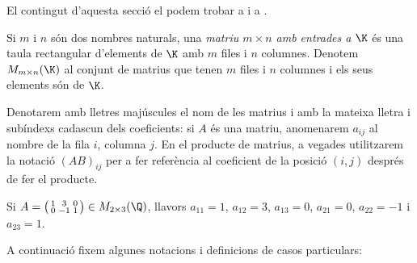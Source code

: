 El contingut d'aquesta secció el podem trobar a \cite[Tema 1]{Bret} i a \cite[Tema 2]{NaXa}.
\begin{definicio}
	Si $m$ i $n$ són dos nombres naturals, una \emph{matriu $m\times n$ amb entrades a $\K$} és una taula rectangular d'elements de $\K$ amb $m$ files i $n$ columnes. Denotem $M_{m\times n}(\K)$ al conjunt de matrius que tenen $m$ files i $n$ columnes i els seus elements són de $\K$.
\end{definicio}
\begin{notacio}
	Denotarem amb lletres majúscules el nom de les matrius i amb la mateixa lletra i subíndexs cadascun dels coeficients: si $A$ és una matriu, anomenarem $a_{ij}$ al nombre de la fila $i$, columna $j$. En el producte de matrius, a vegades utilitzarem la notació $(AB)_{ij}$ per a fer referència al coeficient de la posició $(i,j)$ després de fer el producte.
\end{notacio}
\begin{exemple}
	Si $A=\big(\begin{smallmatrix}
	1 & 3 & 0 \\ 0 & -1 & 1
	\end{smallmatrix}\big) \in M_{2\times3}(\Q)$, llavors $a_{11}=1$, $a_{12}=3$, $a_{13}=0$, $a_{21}=0$, $a_{22}=-1$ i $a_{23}=1$.
\end{exemple}
A continuació fixem algunes notacions i definicions de casos particulars:

